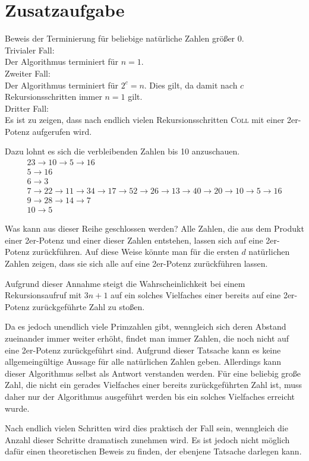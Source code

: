 \documentclass[10pt,a4paper,oneside,ngerman,numbers=noenddot]{scrartcl}
\begin{document}
\section*{Zusatzaufgabe} %
		
	Beweis der Terminierung für beliebige natürliche Zahlen größer $0$.\\
	Trivialer Fall: \\
	Der Algorithmus terminiert für $n=1$. \\
	Zweiter Fall: \\
	Der Algorithmus terminiert für $2^{c} = n$. Dies gilt, da damit nach $c$ Rekursionsschritten immer $n=1$ gilt. \\
	Dritter Fall: \\
	Es ist zu zeigen, dass nach endlich vielen Rekursionsschritten \textsc{Coll} mit einer 2er-Potenz aufgerufen wird.
	
	Dazu lohnt es sich die verbleibenden Zahlen bis 10 anzuschauen.
	\begin{alignat*}{2}
		3 \rightarrow 10 \rightarrow 5 \rightarrow 16 \\
		5 \rightarrow 16 \\
		6 \rightarrow 3 \\
		7 \rightarrow 22 \rightarrow 11 \rightarrow 34 \rightarrow 17 \rightarrow 52 \rightarrow 26 \rightarrow 13 \rightarrow 40 \rightarrow 20 \rightarrow 10 \rightarrow 5 \rightarrow 16 \\
		9 \rightarrow 28 \rightarrow 14 \rightarrow 7 \\
		10 \rightarrow 5
	\end{alignat*}
	
	Was kann aus dieser Reihe geschlossen werden? Alle Zahlen, die aus dem Produkt einer 2er-Potenz und einer dieser Zahlen entstehen, lassen sich auf eine 2er-Potenz zurückführen. Auf diese Weise könnte man für die ersten $d$ natürlichen Zahlen zeigen, dass sie sich alle auf eine 2er-Potenz zurückführen lassen.
	
	Aufgrund dieser Annahme steigt die Wahrscheinlichkeit bei einem Rekursionsaufruf mit $3n+1$ auf ein solches Vielfaches einer bereits auf eine 2er-Potenz zurückgeführte Zahl zu stoßen.
	
	Da es jedoch unendlich viele Primzahlen gibt, wenngleich sich deren Abstand zueinander immer weiter erhöht, findet man immer Zahlen, die noch nicht auf eine 2er-Potenz zurückgeführt sind. Aufgrund dieser Tatsache kann es keine allgemeingültige Aussage für alle natürlichen Zahlen geben. Allerdings kann dieser Algorithmus selbst als Antwort verstanden werden. Für eine beliebig große Zahl, die nicht ein gerades Vielfaches einer bereits zurückgeführten Zahl ist, muss daher nur der Algorithmus ausgeführt werden bis ein solches Vielfaches erreicht wurde.
	
	Nach endlich vielen Schritten wird dies praktisch der Fall sein, wenngleich die Anzahl dieser Schritte dramatisch zunehmen wird. Es ist jedoch nicht möglich dafür einen theoretischen Beweis zu finden, der ebenjene Tatsache darlegen kann.
\end{document}
